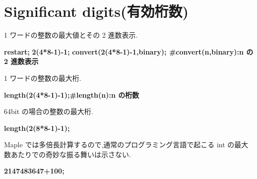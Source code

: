 \documentclass{article}
\begin{document}
\section{\textbf{Significant digits(有効桁数)}}
\begin{maplegroup}
\begin{Maple Normal}{
1 ワードの整数の最大値とその 2 進数表示.}\end{Maple Normal}

\textbf{restart;}
\textbf{2(4*8-1)-1;}
\textbf{convert(2(4*8-1)-1,binary); \#convert(n,binary):n の 2 進数表示}\mapleresult
\begin{maplelatex}
\end{maplelatex}
\mapleresult
\begin{maplelatex}
\end{maplelatex}
\end{maplegroup}
\begin{maplegroup}
\begin{Maple Normal}{
1 ワードの整数の最大桁.}\end{Maple Normal}

\textbf{length(2(4*8-1)-1);\#length(n):n の桁数}\mapleresult
\begin{maplelatex}
\end{maplelatex}
\end{maplegroup}
\begin{maplegroup}
\begin{Maple Normal}{
64bit の場合の整数の最大桁.}\end{Maple Normal}

\textbf{length(2(8*8-1)-1);}\mapleresult
\begin{maplelatex}
\end{maplelatex}
\end{maplegroup}
\begin{maplegroup}
\begin{Maple Normal}{
Maple では多倍長計算するので,通常のプログラミング言語で起こる int の最大数あたりでの奇妙な振る舞いは示さない.}\end{Maple Normal}

\textbf{2147483647+100;}\mapleresult
\begin{maplelatex}
\end{maplelatex}
\end{maplegroup}
\end{document}

